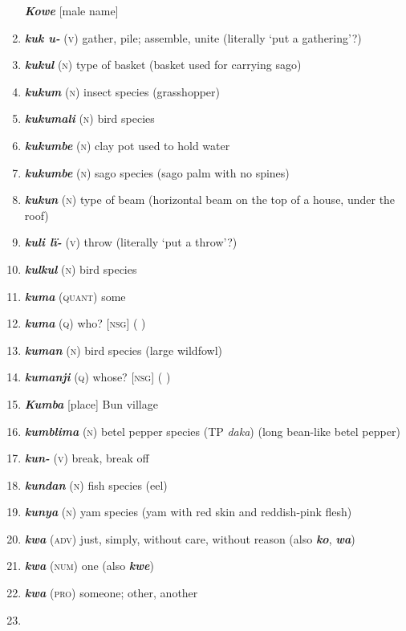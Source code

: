 \begin{enumerate}[noitemsep, label={}, align=left, widest=190, labelsep=1ex,leftmargin=*,itemindent=-10pt]
\textbf{\textit{Kowe}} [male name] \item 
\textbf{\textit{kuk u-}} (\textsc{v}) gather, pile; assemble, unite (literally ‘put a gathering’?) \item 
\textbf{\textit{kukul}} (\textsc{n}) type of basket (basket used for carrying sago) \item 
\textbf{\textit{kukum}} (\textsc{n}) insect species (grasshopper) \item 
\textbf{\textit{kukumali}} (\textsc{n}) bird species \item 
\textbf{\textit{kukumbe}} (\textsc{n}) clay pot used to hold water \item 
\textbf{\textit{kukumbe}} (\textsc{n}) sago species (sago palm with no spines) \item 
\textbf{\textit{kukun}} (\textsc{n}) type of beam (horizontal beam on the top of a house, under the roof) \item 
\textbf{\textit{kuli lï-}} (\textsc{v}) throw (literally ‘put a throw’?) \item 
\textbf{\textit{kulkul}} (\textsc{n}) bird species \item 
\textbf{\textit{kuma}} (\textsc{quant}) some \item 
\textbf{\textit{kuma}} (\textsc{q}) who? [\textsc{nsg}] ( ) \item 
\textbf{\textit{kuman}} (\textsc{n}) bird species (large wildfowl) \item 
\textbf{\textit{kumanji}} (\textsc{q}) whose? [\textsc{nsg}] ( ) \item 
\textbf{\textit{Kumba}} [place] Bun village \item 
\textbf{\textit{kumblima}} (\textsc{n}) betel pepper species (TP \textit{daka}) (long bean-like betel pepper) \item 
\textbf{\textit{kun-}} (\textsc{v}) break, break off \item 
\textbf{\textit{kundan}} (\textsc{n}) fish species (eel) \item 
\textbf{\textit{kunya}} (\textsc{n}) yam species (yam with red skin and reddish-pink flesh) \item 
\textbf{\textit{kwa}} (\textsc{adv}) just, simply, without care, without reason (also \textbf{\textit{ko}}, \textbf{\textit{wa}}) \item 
\textbf{\textit{kwa}} (\textsc{num}) one (also \textbf{\textit{kwe}}) \item 
\textbf{\textit{kwa}} (\textsc{pro}) someone; other, another \item 

\end{enumerate}
